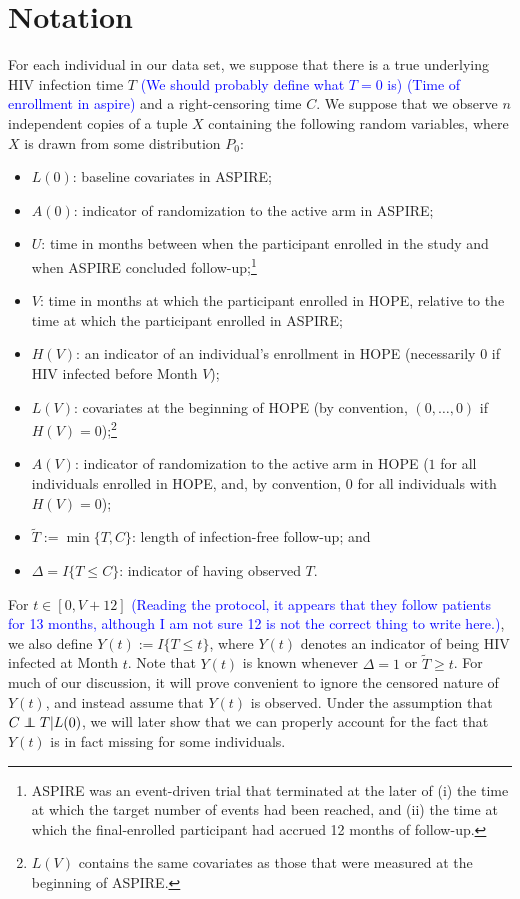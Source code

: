 \documentclass[12pt]{article}
\theoremstyle{definition}
\newcommand\independent{\protect\mathpalette{\protect\independenT}{\perp}}
\def\independenT#1#2{\mathrel{\rlap{$#1#2$}\mkern2mu{#1#2}}}
\newcommand{\Aclose}{U}
\newcommand{\Hopen}{V}
\begin{document}
\section{Notation}
For each individual in our data set, we suppose that there is a true underlying HIV infection time $T$ \textcolor{blue}{(We should probably define what $T = 0$ is) (Time of enrollment in aspire)} and a right-censoring time $C$. We suppose that we observe $n$ independent copies of a tuple $X$ containing the following random variables, where $X$ is drawn from some distribution $P_0$:
\begin{itemize}
    \item $L(0)$: baseline covariates in ASPIRE;
    \item $A(0)$: indicator of randomization to the active arm in ASPIRE;
    \item $\Aclose$: time in months between when the participant enrolled in the study and when ASPIRE concluded follow-up;\footnote{ASPIRE was an event-driven trial that terminated at the later of (i) the time at which the target number of events had been reached, and (ii) the time at which the final-enrolled participant had accrued 12 months of follow-up.}
    \item $\Hopen$: time in months at which the participant enrolled in HOPE, relative to the time at which the participant enrolled in ASPIRE;
    \item $H(\Hopen)$: an indicator of an individual's enrollment in HOPE (necessarily $0$ if HIV infected before Month $\Hopen$);
\item $L(\Hopen)$: covariates at the beginning of HOPE (by convention, $(0,\ldots,0)$ if $H(\Hopen)=0$);\footnote{$L(\Hopen)$ contains the same covariates as those that were measured at the beginning of ASPIRE.}
    \item $A(\Hopen)$: indicator of randomization to the active arm in HOPE ($1$ for all individuals enrolled in HOPE, and, by convention, $0$ for all individuals with $H(\Hopen)=0$);
    \item $\tilde{T}:= \min\{T,C\}$: length of infection-free follow-up; and
    \item $\Delta=I\{T\le C\}$: indicator of having observed $T$.
\end{itemize}
For $t\in[0,\Hopen+12]$ \textcolor{blue}{(Reading the protocol, it appears that they follow patients for 13 months, although I am not sure 12 is not the correct thing to write here.)}, we also define $Y(t):= I\{T\le t\}$, where $Y(t)$ denotes an indicator of being HIV infected at Month $t$. Note that $Y(t)$ is known whenever $\Delta=1$ or $\tilde{T}\ge t$. For much of our discussion, it will prove convenient to ignore the censored nature of $Y(t)$, and instead assume that $Y(t)$ is observed. Under the assumption that $C\independent T | L(0)$, we will later show that we can properly account for the fact that $Y(t)$ is in fact missing for some individuals. %
\end{document}

